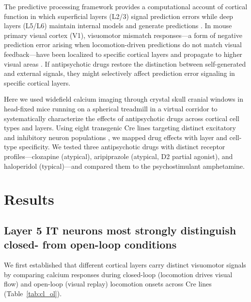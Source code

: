 \documentclass[11pt]{article}
\begin{document}
The predictive processing framework provides a computational account of cortical function in which superficial layers (L2/3) signal prediction errors while deep layers (L5/L6) maintain internal models and generate predictions \citep{rao1999predictive, keller2018predictive}. In mouse primary visual cortex (V1), visuomotor mismatch responses---a form of negative prediction error arising when locomotion-driven predictions do not match visual feedback---have been localized to specific cortical layers and propagate to higher visual areas \citep{zmarz2016mismatch, jordan2020opposing, leinweber2017sensorimotor}. If antipsychotic drugs restore the distinction between self-generated and external signals, they might selectively affect prediction error signaling in specific cortical layers.

Here we used widefield calcium imaging through crystal skull cranial windows \citep{kim2016crystal} in head-fixed mice running on a spherical treadmill in a virtual corridor to systematically characterize the effects of antipsychotic drugs across cortical cell types and layers. Using eight transgenic Cre lines targeting distinct excitatory and inhibitory neuron populations \citep{daigle2018suite}, we mapped drug effects with layer and cell-type specificity. We tested three antipsychotic drugs with distinct receptor profiles---clozapine (atypical), aripiprazole (atypical, D2 partial agonist), and haloperidol (typical)---and compared them to the psychostimulant amphetamine.

\section{Results}

\subsection{Layer 5 IT neurons most strongly distinguish closed- from open-loop conditions}

We first established that different cortical layers carry distinct visuomotor signals by comparing calcium responses during closed-loop (locomotion drives visual flow) and open-loop (visual replay) locomotion onsets across Cre lines (Table~\ref{tab:cl_ol}).
\end{document}
